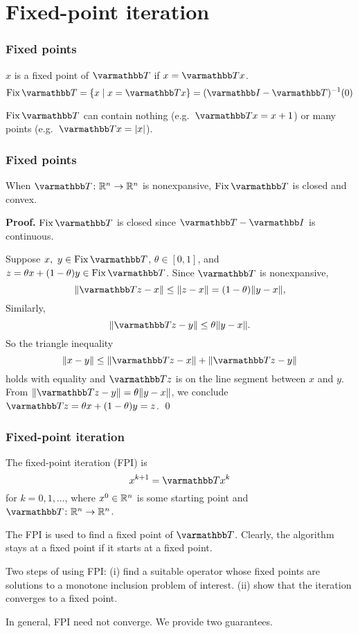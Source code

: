 \documentclass[10pt,mathserif]{beamer}
\begin{document}
\section{Fixed-point iteration}

\begin{frame}
\frametitle{Fixed points}
$x$ is a fixed point of $\opT $ if $x=\opT x$.
\[
\fix \opT =
\{ x \mid x=\opT x \} = (\opI-\opT )^{-1}(0)
\]


\vspace{0.2in}
 $\fix \opT $ can contain nothing (e.g.\ $\opT x=x+1$)
or many points (e.g.\ $\opT x=|x|$).
\end{frame}

\begin{frame}
\frametitle{Fixed points}

When $\opT \colon\reals^n\rightarrow \reals^n$ is nonexpansive, $\fix \opT$ is closed and convex.

 \vspace{0.2in}

\textbf{Proof.}
 $\fix \opT $ is closed since $\opT -\opI$ is continuous.

Suppose $x,~y\in \fix \opT $, $\theta \in [0,1]$, and $z=\theta x+ (1-\theta) y \in \fix \opT $.
Since $\opT $ is nonexpansive,
\[
\|\opT z-x\| \leq \| z-x \| = (1-\theta) \| y-x \|,
\]
Similarly,
\[
\| \opT z-y\| \leq \theta \| y-x \|.
\]
So the triangle inequality
\[
\|x-y\| \leq \|\opT z-x\| + \|\opT z-y\|
\]
holds with equality and $\opT z$ is on the line segment between
$x$ and $y$.  From $\|\opT z-y\|=\theta \|y-x\|$,
we conclude $\opT z=\theta x+ (1-\theta)y=z$. \qed
\end{frame}



\begin{frame}
\frametitle{Fixed-point iteration}
The fixed-point iteration (FPI) is
\[
x^{k+1}=\opT x^k
\]
for $k=0,1,\dots$, where $x^0\in \mathbb{R}^n$ is some starting point
and $\opT \colon\reals^n\rightarrow\reals^n$.

\vspace{0.2in}
The FPI is used to find a fixed point of $\opT $.
Clearly, the algorithm stays at a fixed point if it starts at a fixed point.


\vspace{0.2in}
Two steps of using FPI:
(i)  find a suitable  operator whose fixed points are solutions to a monotone inclusion problem of interest.
(ii) show that the iteration converges to a fixed point.

\vspace{0.2in}

In general, FPI need not converge.
We provide two guarantees.
\end{frame}
\end{document}
